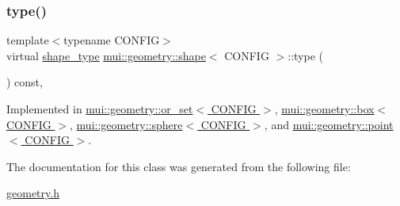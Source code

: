 \mbox{\label{classmui_1_1geometry_1_1shape_a4a0fe17b8ca5cc29e260cb38c9fcf8fe}} 
\subsubsection{\texorpdfstring{type()}{type()}}
{\footnotesize\ttfamily template$<$typename C\+O\+N\+F\+IG$>$ \\
virtual \hyperlink{namespacemui_1_1geometry_a5f311a343181e2f20482e5c9afb0f136}{shape\+\_\+type} \hyperlink{classmui_1_1geometry_1_1shape}{mui\+::geometry\+::shape}$<$ C\+O\+N\+F\+IG $>$\+::type (\begin{DoxyParamCaption}{ }\end{DoxyParamCaption}) const\hspace{0.3cm}{\ttfamily [pure virtual]}, {\ttfamily [noexcept]}}



Implemented in \hyperlink{classmui_1_1geometry_1_1or__set_a1cb6c72bb7be1fca6ccd038cf6d6946e}{mui\+::geometry\+::or\+\_\+set$<$ C\+O\+N\+F\+I\+G $>$}, \hyperlink{classmui_1_1geometry_1_1box_a88a57a405777e8f34e632030d725f7be}{mui\+::geometry\+::box$<$ C\+O\+N\+F\+I\+G $>$}, \hyperlink{classmui_1_1geometry_1_1sphere_a2440f819caae9c92a2cf8c253989c38f}{mui\+::geometry\+::sphere$<$ C\+O\+N\+F\+I\+G $>$}, and \hyperlink{classmui_1_1geometry_1_1point_ad8984905be09323d1e8d9189fc4a099f}{mui\+::geometry\+::point$<$ C\+O\+N\+F\+I\+G $>$}.



The documentation for this class was generated from the following file\+:\begin{DoxyCompactItemize}
\item 
\hyperlink{geometry_8h}{geometry.\+h}\end{DoxyCompactItemize}

